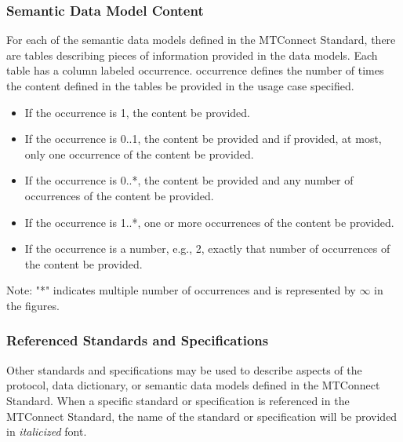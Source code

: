 \documentclass{mtconnect}	%
\begin{document}
\subsubsection{Semantic Data Model Content}

For each of the \glspl{semantic data model} defined in the MTConnect Standard, there are tables describing pieces of information provided in the data models.  Each table has a column labeled \gls{occurrence}. \gls{occurrence} defines the number of times the content defined in the tables \MAY be provided in the usage case specified.

\begin{itemize}

\item If the \gls{occurrence} is 1, the content \MUST be provided.

\item If the \gls{occurrence} is 0..1, the content \MAY be provided and if provided, at most, only one occurrence of the content \MUST be provided.

\item If the \gls{occurrence} is 0..*, the content \MAY be provided and any number of occurrences of the content \MAY be provided.

\item If the \gls{occurrence} is 1..*, one or more occurrences of the content \MUST be provided.

\item If the \gls{occurrence} is a number, e.g., 2, exactly that number of occurrences of the content \MUST be provided.

\end{itemize}

\begin{note}
Note: "*" indicates multiple number of occurrences and is represented by $\infty$ in the figures.

\end{note}

\subsubsection{Referenced Standards and Specifications}

Other standards and specifications may be used to describe aspects of the protocol, \gls{data dictionary}, or \glspl{semantic data model} defined in the MTConnect Standard.  When a specific standard or specification is referenced in the MTConnect Standard, the name of the standard or specification will be provided in \textit{italicized} font.  
\end{document}
